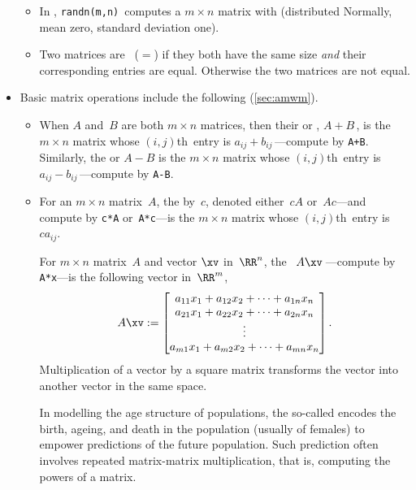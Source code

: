 \begin{itemize}
\begin{itemize}
\item In \script, \verb|randn(m,n)|~computes a \(m\times n\) matrix with  (distributed Normally, mean zero, standard deviation one).

\item Two matrices are ~(\(=\)) if they both have the same size \emph{and} their corresponding entries are equal.
Otherwise the two matrices are not equal.

\end{itemize}


\item Basic matrix operations include the following (\cref{sec:amwm}).
\begin{itemize}
\item When \(A\) and~\(B\) are both \(m\times n\) matrices, then their  or , \(A+B\)\,, is the \(m\times n\) matrix whose \((i,j)\)th~entry is \(a_{ij}+b_{ij}\)\,---compute by \verb|A+B|.  
Similarly,  the  or  \(A-B\) is the \(m\times n\) matrix whose \((i,j)\)th~entry is \(a_{ij}-b_{ij}\)\,---compute by \verb|A-B|.

\item For an \(m\times n\) matrix~\(A\), the  by~\(c\), denoted either~\(cA\) or~\(Ac\)---and compute by \verb|c*A| or~\verb|A*c|---is the \(m\times n\) matrix whose \((i,j)\)th~entry is~\(ca_{ij}\).

\itemhi For \(m\times n\) matrix~\(A\) and vector \(\xv\) in~\(\RR^n\), the ~\(A\xv\)\,---compute by \verb|A*x|---is the following vector in~\(\RR^m\),
\begin{equation*}
A\xv:=
\begin{bmatrix} a_{11}x_1+a_{12}x_2+\cdots+a_{1n}x_n
\\a_{21}x_1+a_{22}x_2+\cdots+a_{2n}x_n
\\\vdots
\\a_{m1}x_1+a_{m2}x_2+\cdots+a_{mn}x_n
\end{bmatrix}.
\end{equation*}
Multiplication of a vector by a square matrix transforms the vector into another vector in the same space.

\itemme In modelling the age structure of populations, the so-called  encodes the birth, ageing, and death in the population (usually of females) to empower predictions of the future population.
Such prediction often involves repeated matrix-matrix multiplication, that is, computing the powers of a matrix.


\end{itemize}
\end{itemize}
